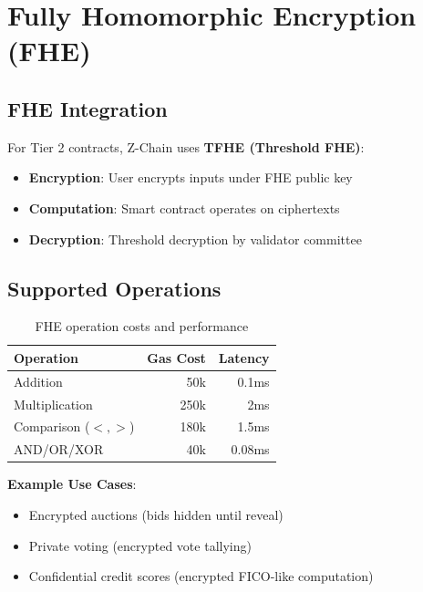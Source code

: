 \section{Fully Homomorphic Encryption (FHE)}


\subsection{FHE Integration}

For Tier 2 contracts, Z-Chain uses \textbf{TFHE (Threshold FHE)}:

\begin{itemize}[leftmargin=1.1em]
  \item \textbf{Encryption}: User encrypts inputs under FHE public key
  \item \textbf{Computation}: Smart contract operates on ciphertexts
  \item \textbf{Decryption}: Threshold decryption by validator committee
\end{itemize}

\subsection{Supported Operations}

\begin{table}[h]
\centering
\begin{tabular}{lrr}
\toprule
Operation & Gas Cost & Latency \\
\midrule
Addition & 50k & 0.1ms \\
Multiplication & 250k & 2ms \\
Comparison ($<, >$) & 180k & 1.5ms \\
AND/OR/XOR & 40k & 0.08ms \\
\bottomrule
\end{tabular}
\caption{FHE operation costs and performance}
\end{table}

\textbf{Example Use Cases}:
\begin{itemize}[leftmargin=1.1em]
  \item Encrypted auctions (bids hidden until reveal)
  \item Private voting (encrypted vote tallying)
  \item Confidential credit scores (encrypted FICO-like computation)
\end{itemize}

